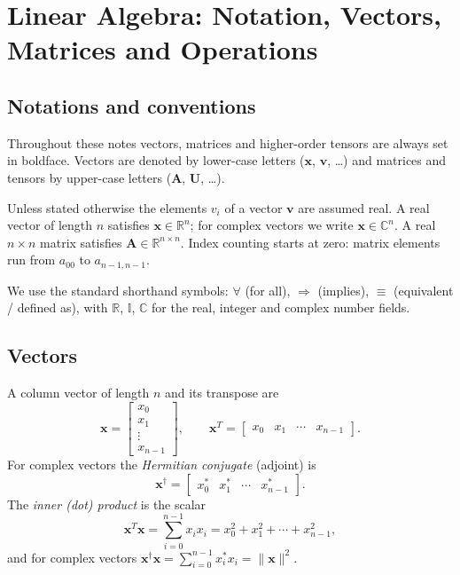 \chapter{Linear Algebra: Notation, Vectors, Matrices and Operations}
\label{chap:linalg}

\section{Notations and conventions}
\label{sec:notation}

Throughout these notes vectors, matrices and higher-order tensors are
always set in boldface.  Vectors are denoted by lower-case letters
($\bm{x}$, $\bm{v}$, \ldots) and matrices and tensors by upper-case
letters ($\bm{A}$, $\bm{U}$, \ldots).

Unless stated otherwise the elements $v_i$ of a vector $\bm{v}$ are
assumed real.  A real vector of length $n$ satisfies $\bm{x}\in
\mathbb{R}^{n}$; for complex vectors we write $\bm{x}\in
\mathbb{C}^{n}$.  A real $n\times n$ matrix satisfies $\bm{A}\in
\mathbb{R}^{n\times n}$.  Index counting starts at zero: matrix
elements run from $a_{00}$ to $a_{n-1,n-1}$.

We use the standard shorthand symbols: $\forall$ (for all),
$\Rightarrow$ (implies), $\equiv$ (equivalent / defined as), with
$\mathbb{R}$, $\mathbb{I}$, $\mathbb{C}$ for the real, integer and
complex number fields.

\section{Vectors}
\label{sec:vectors}

A column vector of length $n$ and its transpose are
\[
  \bm{x} = \begin{bmatrix} x_0 \\ x_1 \\ \vdots \\ x_{n-1} \end{bmatrix},
  \qquad
  \bm{x}^{T} =
    \begin{bmatrix} x_0 & x_1 & \cdots & x_{n-1} \end{bmatrix}.
\]
For complex vectors the \emph{Hermitian conjugate} (adjoint) is
\[
  \bm{x}^{\dagger} =
    \begin{bmatrix} x_0^* & x_1^* & \cdots & x_{n-1}^* \end{bmatrix}.
\]
The \emph{inner (dot) product} is the scalar
\[
  \bm{x}^{T}\bm{x} = \sum_{i=0}^{n-1} x_i x_i
    = x_0^2 + x_1^2 + \cdots + x_{n-1}^2,
\]
and for complex vectors
$\bm{x}^{\dagger}\bm{x} = \sum_{i=0}^{n-1} x_i^* x_i = \|{\bm x}\|^2$.

